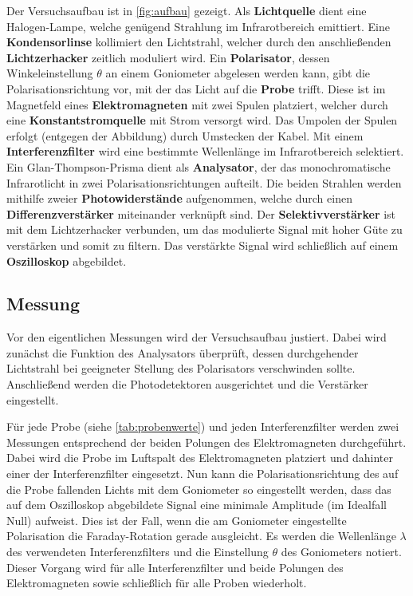 Der Versuchsaufbau ist in \autoref{fig:aufbau} gezeigt.
Als \textbf{Lichtquelle} dient eine Halogen-Lampe,
    welche genügend Strahlung im Infrarotbereich emittiert.
Eine \textbf{Kondensorlinse} kollimiert den Lichtstrahl,
    welcher durch den anschließenden \textbf{Lichtzerhacker} zeitlich moduliert wird.
Ein \textbf{Polarisator},
    dessen Winkeleinstellung $\theta$ an einem Goniometer abgelesen werden kann,
gibt die Polarisationsrichtung vor,
    mit der das Licht auf die \textbf{Probe} trifft.
Diese ist im Magnetfeld eines \textbf{Elektromagneten} mit zwei Spulen platziert,
    welcher durch eine \textbf{Konstantstromquelle} mit Strom versorgt wird.
Das Umpolen der Spulen erfolgt (entgegen der Abbildung) durch Umstecken der Kabel.
Mit einem \textbf{Interferenzfilter} wird eine bestimmte Wellenlänge im Infrarotbereich selektiert.
Ein Glan-Thompson-Prisma dient als \textbf{Analysator},
    der das monochromatische Infrarotlicht in zwei Polarisationsrichtungen aufteilt.
Die beiden Strahlen werden mithilfe zweier \textbf{Photowiderstände} aufgenommen, %
    welche durch einen \textbf{Differenzverstärker} miteinander verknüpft sind.
Der \textbf{Selektivverstärker} ist mit dem Lichtzerhacker verbunden,
    um das modulierte Signal mit hoher Güte zu verstärken und somit zu filtern.
Das verstärkte Signal wird schließlich auf einem \textbf{Oszilloskop} abgebildet.



\subsection{Messung}
\label{sec:durchfuehrung:messung}
Vor den eigentlichen Messungen wird der Versuchsaufbau justiert.
Dabei wird zunächst die Funktion des Analysators überprüft,
    dessen durchgehender Lichtstrahl bei geeigneter Stellung des Polarisators verschwinden sollte.
Anschließend werden die Photodetektoren ausgerichtet und die Verstärker eingestellt.

Für jede Probe (siehe \autoref{tab:probenwerte}) und jeden Interferenzfilter werden zwei Messungen entsprechend der beiden Polungen des Elektromagneten durchgeführt.
Dabei wird die Probe im Luftspalt des Elektromagneten platziert und dahinter einer der Interferenzfilter eingesetzt.
Nun kann die Polarisationsrichtung des auf die Probe fallenden Lichts mit dem Goniometer so eingestellt werden,
dass das auf dem Oszilloskop abgebildete Signal eine minimale Amplitude (im Idealfall Null) aufweist.
Dies ist der Fall, wenn die am Goniometer eingestellte Polarisation die Faraday-Rotation gerade ausgleicht.
Es werden die Wellenlänge $\lambda$ des verwendeten Interferenzfilters und die Einstellung $\theta$ des Goniometers notiert.
Dieser Vorgang wird für alle Interferenzfilter und beide Polungen des Elektromagneten sowie schließlich für alle Proben wiederholt.

